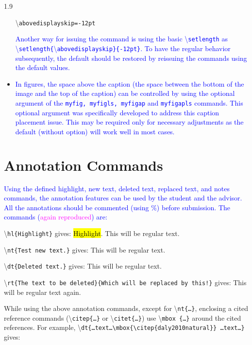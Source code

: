 \documentclass[phd]{ndsu-thesis-2022}
\newcommand\myspacing{1.9} %
\newcommand\italk[1]{\textcolor{blue}{#1}}  %
\newcommand\cmd[1]{\textbackslash\texttt{#1}}  %
\begin{document}
\begin{spacing}{\myspacing}
\begin{itemize}
\cmd{abovedisplayskip=-12pt}

\italk{Another way for issuing the command is using the basic \cmd{setlength} as \\ \cmd{setlength\{}\cmd{abovedisplayskip\}\{-12pt\}}. To have the regular behavior subsequently, the default should be restored by reissuing the commands using the default values.}
\item
\italk{In figures, the space above the caption (the space between the bottom of the image and the top of the caption) can be controlled by using the optional argument of the \texttt{myfig, myfigls, myfigap} and \texttt{myfigapls} commands. This optional argument was specifically developed to address this caption placement issue. This may be required only for necessary adjustments as the default (without option) will work well in most cases.}
\end{itemize}

\section{Annotation Commands}
\italk{Using the defined highlight, new text, deleted text, replaced text, and notes commands, the annotation features can be used by the student and the advisor. All the annotations should be commented (using \%) before submission. The commands (\textcolor{magenta}{again reproduced}) are:} 

\textbackslash\texttt{hl\{Highlight\}} gives: \hl{Highlight}. This will be regular text. 

\textbackslash\texttt{nt\{Test new text.\}} gives:  This will be regular text. 

\textbackslash\texttt{dt\{Deleted text.\}} gives:  This will be regular text. 

\textbackslash\texttt{rt\{The text to be deleted\}\{Which will be replaced by this!\}} gives:  This will be regular text again. 

\vspace{1.5ex}
While using the above annotation commands, except for \cmd{nt\{\ldots\}}, enclosing a cited reference commands (\cmd{citep\{\ldots\}} or \cmd{citet\{\ldots\}}) use \cmd{mbox
\{\ldots\}} around the cited references. For example, \cmd{dt\{\ldots text\ldots \cmd{mbox\{\cmd{citep\{daly2010natural\}}\}} \ldots text\ldots\}} 
gives:  


\end{spacing}
\end{document}
